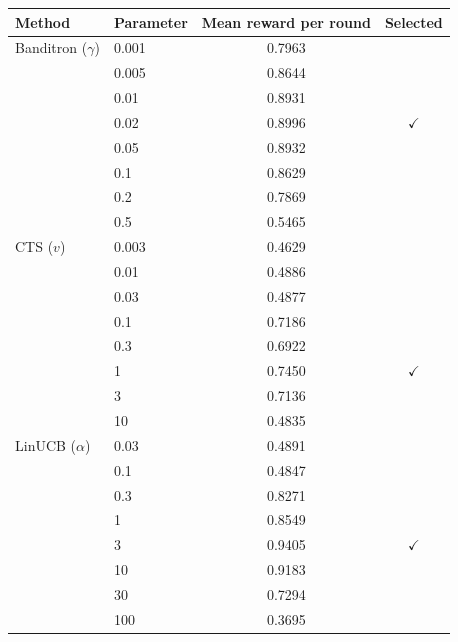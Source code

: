 \begin{tabular}{llcc}
\toprule
Method & Parameter & Mean reward per round & Selected \\
\midrule
Banditron ($\gamma$) & 0.001 & 0.7963 &  \\
 & 0.005 & 0.8644 &  \\
 & 0.01 & 0.8931 &  \\
 & 0.02 & 0.8996 & $\checkmark$ \\
 & 0.05 & 0.8932 &  \\
 & 0.1 & 0.8629 &  \\
 & 0.2 & 0.7869 &  \\
 & 0.5 & 0.5465 &  \\
CTS ($v$) & 0.003 & 0.4629 &  \\
 & 0.01 & 0.4886 &  \\
 & 0.03 & 0.4877 &  \\
 & 0.1 & 0.7186 &  \\
 & 0.3 & 0.6922 &  \\
 & 1 & 0.7450 & $\checkmark$ \\
 & 3 & 0.7136 &  \\
 & 10 & 0.4835 &  \\
LinUCB ($\alpha$) & 0.03 & 0.4891 &  \\
 & 0.1 & 0.4847 &  \\
 & 0.3 & 0.8271 &  \\
 & 1 & 0.8549 &  \\
 & 3 & 0.9405 & $\checkmark$ \\
 & 10 & 0.9183 &  \\
 & 30 & 0.7294 &  \\
 & 100 & 0.3695 &  \\
\bottomrule
\end{tabular}
